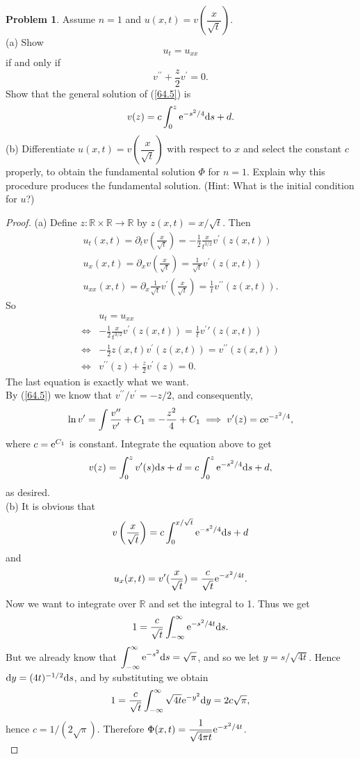\documentclass[hyperref,UTF8,12pt]{article}
\numberwithin{equation}{subsection}
\theoremstyle{plain}
\theoremstyle{definition}
\newtheorem{problem}{Problem}
\numberwithin{theorem}{section}
\numberwithin{lemma}{section}
\numberwithin{proposition}{section}
\numberwithin{remark}{section}
\numberwithin{corollary}{section}
\numberwithin{definition}{section}
\numberwithin{problem}{section}
\numberwithin{example}{section}
\def\e{\textup{e}}
\def\dif{\textup{d}}
\newcommand{\dis}{\displaystyle}
\newcommand{\ptl}{\partial}
\newcommand{\mr}{\mathbb{R}}
\begin{document}
\begin{problem}
Assume $n=1$ and $u(x,t)=v\left(\dfrac{x}{\sqrt{t}}\right)$.\\
(a) Show\[u_t=u_{xx}\]if and only if\begin{equation}
	v^{\prime\prime}+\frac{z}{2}v^\prime=0.\tag{$\ast$}\label{64.5}
\end{equation}
Show that the general solution of (\ref{64.5}) is\[v(z)=c\int_0^z\e^{-s^2/4}\dif s+d.\]
(b) Differentiate $u(x, t)=v\left(\dfrac{x}{\sqrt{t}}\right)$ with respect to $x$ and select the constant $c$ properly, to obtain the fundamental solution $\Phi$ for $n=1$. Explain why this procedure produces the fundamental solution. (Hint: What is the initial condition for $u$?)
\end{problem}
\begin{proof}
(a) Define $z:\mr\times\mr\to\mr$ by $z(x,t)=x/\sqrt{t}$. Then \[\begin{gathered}
	u_t(x,t)=\ptl_tv\left(\frac{x}{\sqrt{t}}\right)=-\frac{1}{2}\frac{x}{t^{3/2}} v^\prime(z(x,t))\\
	u_x(x,t)=\ptl_xv\left(\frac{x}{\sqrt{t}}\right)=\frac{1}{\sqrt{t}}v^\prime(z(x,t))\\
	u_{xx}(x,t)=\ptl_x\frac{1}{\sqrt{t}} v^\prime\left(\frac{x}{\sqrt{t}}\right)=\frac{1}{t}v^{\prime\prime}(z(x,t)).
\end{gathered}\]So \[\begin{aligned}
	&u_t=u_{xx}\\
	\iff&-\frac{1}{2}\frac{x}{t^{3/2}}v^\prime(z(x,t))=\frac{1}{t}v^\prime\prime(z(x,t))\\
	\iff&-\frac{1}{2}z(x,t)v^\prime(z(x,t))=v^{\prime\prime}(z(x,t))\\
	\iff&v^{\prime\prime}(z)+\frac{z}{2}v^\prime(z)=0.
\end{aligned}\]The last equation is exactly what we want.\\
By (\ref{64.5}) we know that $v^{\prime\prime}/v^\prime=-z/2$, and consequently, \[\ln v^\prime =\int\frac{v^{\prime\prime}}{v^\prime}+C_1=-\frac{z^2}{4}+C_1\implies v^\prime(z)=c\e^{-z^2/4},\]where $c=\e^{C_1}$ is constant. Integrate the equation above to get \[v(z)=\int_0^zv^\prime(s)\dif s+d=c\int_0^z\e^{-s^2/4}\dif s+d,\]as desired.\\
(b) It is obvious that \[v\left(\frac{x}{\sqrt{t}}\right)=c\int_0^{x/\sqrt{t}}\e^{-s^2/4}\dif s+d\]and\[u_x(x,t)=v^\prime(\frac{x}{\sqrt{t}})=\frac{c}{\sqrt{t}}\e^{-x^2/4t}.\]Now we want to integrate over $\mr$ and set the integral to 1. Thus we get \[1=\frac{c}{\sqrt{t}}\int_{-\infty}^\infty\e^{-s^2/4t}\dif s.\]But we already know that $\dis\int_{-\infty}^\infty\e^{-s^2}\dif s=\sqrt{\pi}$, and so we let $y=s/\sqrt{4t}$. Hence $\dif y=(4t)^{-1/2}\dif s$, and by substituting we obtain \[1=\frac{c}{\sqrt{t}}\int_{-\infty}^\infty\sqrt{4t}\e^{-y^2}\dif y=2c\sqrt{\pi},\]hence $c=1/(2\sqrt{\pi})$. Therefore $\Phi(x,t)=\dfrac{1}{\sqrt{4\pi t}}\e^{-x^2/4t}$.\\[3pt]

\end{proof}
\end{document}
